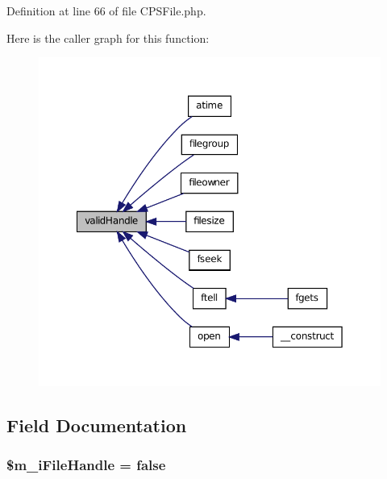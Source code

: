Definition at line 66 of file CPSFile.php.








Here is the caller graph for this function:\nopagebreak
\begin{figure}[H]
\begin{center}
\leavevmode
\includegraphics[width=356pt]{classCPSFile_aae2e3c4d391bb2351f514744bf7fba9e_icgraph}
\end{center}
\end{figure}




\subsection{Field Documentation}
\hypertarget{classCPSFile_ae1c439cc9ed3168e874825f2f8e01dfc}{
\subsubsection[{\$m\_\-iFileHandle}]{\setlength{\rightskip}{0pt plus 5cm}\$m\_\-iFileHandle = false}}
\label{classCPSFile_ae1c439cc9ed3168e874825f2f8e01dfc}


